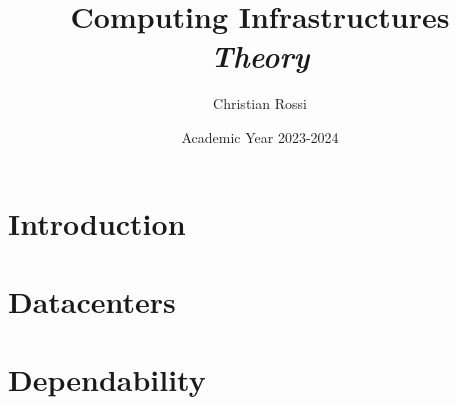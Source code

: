 \documentclass[12pt, a4paper]{report}
\title{Computing Infrastructures \\ \textit{Theory}}
\author{Christian Rossi}
\date{Academic Year 2023-2024}
\begin{document}
    \maketitle

    

    \cleardoublepage

    \tableofcontents

    \cleardoublepage

    \chapter{Introduction}
    
    

    \chapter{Datacenters}
    
    
    
    
    

    \chapter{Dependability}
    
      
    
    
    
\end{document}
